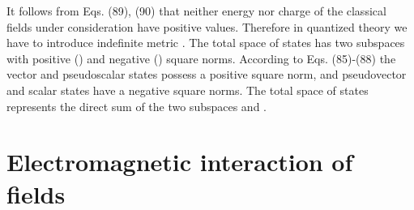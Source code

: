 \documentclass[a4paper,12pt]{article}
\begin{document}
It follows from Eqs. (89), (90) that neither energy nor charge of
the classical fields under consideration have positive values.
Therefore in quantized theory we have to introduce indefinite
metric \cite{monogr}. The total space of states has two subspaces
with positive (\coordHE{}) and negative (\coordHE{}) square norms. According
to Eqs. (85)-(88) the vector and pseudoscalar states possess a
positive square norm, and pseudovector and scalar states have a
negative square norms. The total space of states represents the
direct sum of the two subspaces \coordHE{} and \coordHE{}.

\section{Electromagnetic interaction of fields}
\end{document}
